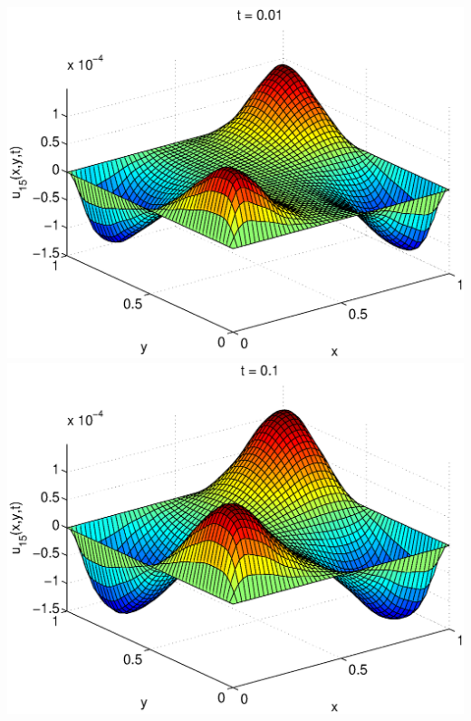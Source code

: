 \begin{solution}
\begin{enumerate}
\includegraphics[scale=0.4]{heat2d3}
\includegraphics[scale=0.4]{heat2d4}


\end{enumerate}
\end{solution}
